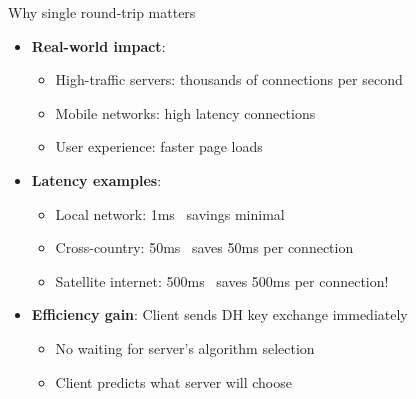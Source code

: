 \ifdefined\PRESENTATION\else\PassOptionsToClass{handout}{beamer}\fi\documentclass[aspectratio=169, lualatex]{beamer}
\begin{document}
\begin{frame}{Why single round-trip matters}
	\begin{itemize}
		\item \textbf{Real-world impact}:
		      \begin{itemize}
			      \item High-traffic servers: thousands of connections per second
			      \item Mobile networks: high latency connections
			      \item User experience: faster page loads
		      \end{itemize}
		\item \textbf{Latency examples}:
		      \begin{itemize}
			      \item Local network: 1ms \rightarrow\ savings minimal
			      \item Cross-country: 50ms \rightarrow\ saves 50ms per connection
			      \item Satellite internet: 500ms \rightarrow\ saves 500ms per connection!
		      \end{itemize}
		\item \textbf{Efficiency gain}: Client sends DH key exchange immediately
		      \begin{itemize}
			      \item No waiting for server's algorithm selection
			      \item Client predicts what server will choose
		      \end{itemize}
	\end{itemize}
\end{frame}
\end{document}
